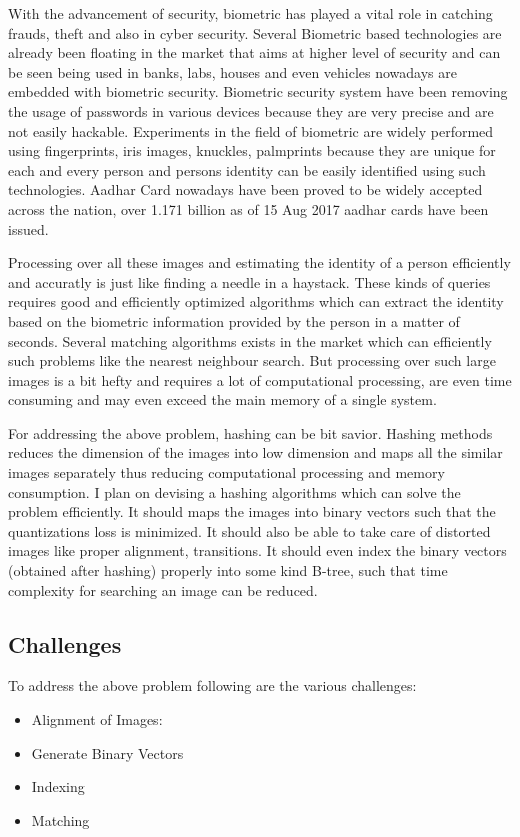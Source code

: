\documentclass[12pt, a4paper,twoside]{article}
\begin{document}
\label{sec:Problem Statement}
	With the advancement of security, biometric has played a vital role in catching frauds, theft and also in cyber security.
	Several Biometric based technologies are already been floating in the market that aims at higher level of security and can be seen being used in banks,
	labs, houses and even vehicles nowadays are embedded with biometric security. Biometric security system have been removing the usage of passwords in various devices because they are very precise and are not easily hackable. Experiments in the field of biometric are widely performed using fingerprints, iris images, knuckles, palmprints because they are unique for each and every person and persons identity can be easily identified using such technologies.
	Aadhar Card nowadays have been proved to be widely accepted across the nation, over 1.171 billion as of 15 Aug 2017 aadhar cards have been issued.

	Processing over all these images and estimating the identity of a person efficiently and accuratly is just like finding a needle in a haystack.
	These kinds of queries requires good and efficiently optimized algorithms which can extract the identity based on the biometric information provided by the person in a matter of seconds. Several matching algorithms exists in the market which can efficiently such problems like the nearest neighbour search.
	But processing over such large images is a bit hefty and requires a lot of computational processing, are even time consuming and may even exceed the main memory of a single system.

	For addressing the above problem, hashing can be bit savior. Hashing methods reduces the dimension of the images into low dimension and maps all the similar
	images separately thus reducing computational processing and memory consumption. I plan on devising a hashing algorithms which can solve the problem efficiently. It should maps the images into binary vectors such that the quantizations loss is minimized. It should also be able to take care of distorted images like proper alignment, transitions. It should even index the binary vectors (obtained after hashing) properly into some kind B-tree, such that time complexity for searching an image can be reduced. 

\subsection{Challenges}
\label{sec:challenges}
	To address the above problem following are the various challenges:

\begin{itemize}
	\item Alignment of Images:
	\item Generate Binary Vectors
	\item Indexing
	\item Matching

\end{itemize}
\end{document}
